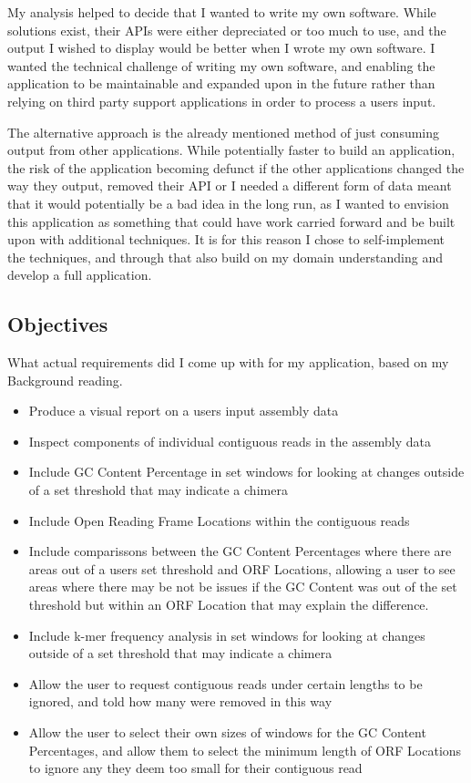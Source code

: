 My analysis helped to decide that I wanted to write my own software. While solutions exist, their APIs were either depreciated or too much to use, and the output I wished to display would be better when I wrote my own software. I wanted the technical challenge of writing my own software, and enabling the application to be maintainable and expanded upon in the future rather than relying on third party support applications in order to process a users input.

The alternative approach is the already mentioned method of just consuming output from other applications. While potentially faster to build an application, the risk of the application becoming defunct if the other applications changed the way they output, removed their API or I needed a different form of data meant that it would potentially be a bad idea in the long run, as I wanted to envision this application as something that could have work carried forward and be built upon with additional techniques. It is for this reason I chose to self-implement the techniques, and through that also build on my domain understanding and develop a full application.

\subsection{Objectives}
What actual requirements did I come up with for my application, based on my Background reading.
\begin{itemize}
\item Produce a visual report on a users input assembly data
\item Inspect components of individual contiguous reads in the assembly data
\item Include GC Content Percentage in set windows for looking at changes outside of a set threshold that may indicate a chimera
\item Include Open Reading Frame Locations within the contiguous reads
\item Include comparissons between the GC Content Percentages where there are areas out of a users set threshold and ORF  Locations, allowing a user to see areas where there may be not be issues if the GC Content was out of the set threshold but within an ORF Location that may explain the difference.
\item Include k-mer frequency analysis  in set windows for looking at changes outside of a set threshold that may indicate a chimera
\item Allow the user to request contiguous reads under certain lengths to be ignored, and told how many were removed in this way
\item Allow the user to select their own sizes of windows for the GC Content Percentages, and allow them to select the minimum length of ORF Locations to ignore any they deem too small for their contiguous read
\end{itemize}

